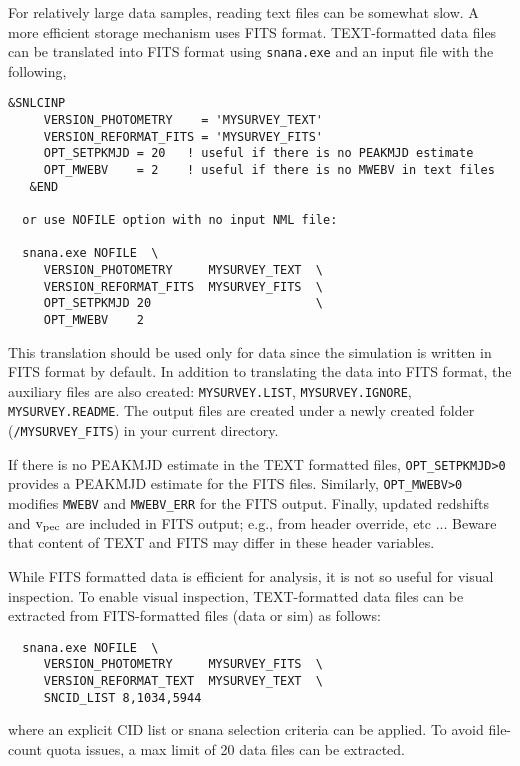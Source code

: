 \documentclass[12pt]{article}
\newcommand{\vpec}{{\rm v}_{\rm pec}}
\begin{document}
For relatively large data samples,
reading text files can be somewhat slow.
A more efficient storage mechanism uses FITS format.
TEXT-formatted data files can be translated into
FITS format using {\tt snana.exe} and an input
file with the following,
%
\begin{Verbatim}[frame=single]
  &SNLCINP
     VERSION_PHOTOMETRY    = 'MYSURVEY_TEXT'
     VERSION_REFORMAT_FITS = 'MYSURVEY_FITS'
     OPT_SETPKMJD = 20   ! useful if there is no PEAKMJD estimate
     OPT_MWEBV    = 2    ! useful if there is no MWEBV in text files
   &END

  or use NOFILE option with no input NML file:

  snana.exe NOFILE  \
     VERSION_PHOTOMETRY     MYSURVEY_TEXT  \  
     VERSION_REFORMAT_FITS  MYSURVEY_FITS  \
     OPT_SETPKMJD 20                       \ 
     OPT_MWEBV    2
\end{Verbatim}
%
This translation should be used only for data
since the simulation is written in FITS format by default.
In addition to translating the data into FITS format,
the auxiliary files are also created: 
{\tt MYSURVEY.LIST}, 
{\tt MYSURVEY.IGNORE}, 
{\tt MYSURVEY.README}.
The output files are created under a newly created folder 
({\tt /MYSURVEY\_FITS}) in your current directory.

If there is no PEAKMJD estimate in the TEXT formatted files,
{\tt OPT\_SETPKMJD>0} provides a PEAKMJD estimate for the FITS files.
Similarly, {\tt OPT\_MWEBV>0} modifies {\tt MWEBV} and {\tt MWEBV\_ERR}
for the FITS output. Finally, updated redshifts and $\vpec$
are included in FITS output; e.g., from header override, etc ...
Beware that content of TEXT and FITS may differ in these header variables.

\medskip
While FITS formatted data is efficient for analysis,
it is not so useful for visual inspection. 
To enable visual inspection, TEXT-formatted
data files can be extracted from FITS-formatted files
(data or sim) as follows:
\begin{verbatim}
  snana.exe NOFILE  \
     VERSION_PHOTOMETRY     MYSURVEY_FITS  \  
     VERSION_REFORMAT_TEXT  MYSURVEY_TEXT  \
     SNCID_LIST 8,1034,5944
\end{verbatim}
%
where an explicit CID list or snana selection criteria can 
be applied. To avoid file-count quota issues, 
a max limit of 20 data files can be extracted.
\end{document}
